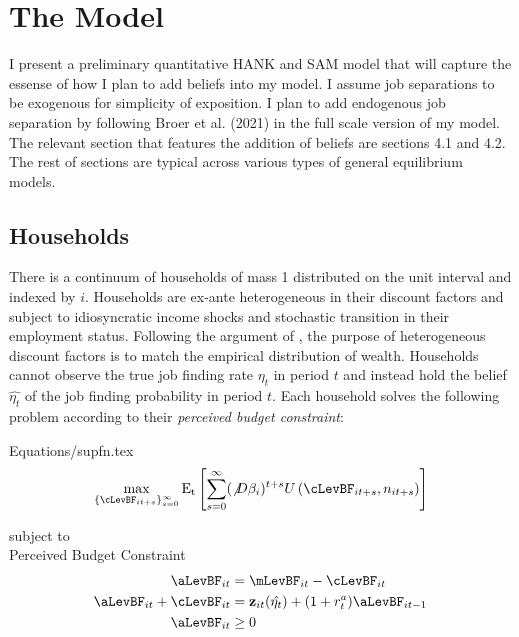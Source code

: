 \documentclass[titlepage]{\econtex}\providecommand{\texname}{Dissertation-Proposal}
\providecommand{\EqDir}{Equations}
\begin{document}
\hypertarget{The-Model}{}
\section{The Model}

I present a preliminary quantitative HANK and SAM model that will capture the essense of how I plan to add beliefs into my model. I assume job separations to be exogenous for simplicity of exposition. I plan to add endogenous job separation by following Broer et al. (2021) in the full scale version of my model. The relevant section that features the addition of beliefs are sections 4.1 and 4.2. The rest of sections are typical across various types of general equilibrium models.

\subsection{Households}
\label{subsec:Households}

There is a continuum of households of mass 1 distributed on the unit
interval and indexed by $i$. Households are ex-ante heterogeneous in their discount factors and subject to idiosyncratic income shocks and stochastic transition in their employment status. Following the argument of \cite{carroll2017distribution}, the purpose of heterogeneous discount factors is to match the empirical distribution of wealth. Households cannot observe the true job finding rate $\eta_{t}$ in period $t$ and instead hold the belief $\hat{\eta_{t}}$ of the job finding probability in period $t$. Each household solves  the following problem according to their \textit{perceived budget constraint}:

\begin{verbatimwrite}{\EqDir/supfn.tex}
\begin{eqnarray}
  \label{eq:supfn}
  \max_{\{\cLevBF_{it+s}\}_{s=0}^{\infty}} \mathrm{E_{t}}\left[\sum_{s=0}^{\infty} (\not D \beta_{i})^{t+s} U\left(  \cLevBF_{i t+s}, n_{i t+s}\right)\right]
\end{eqnarray}
\end{verbatimwrite}
 

subject to \\

Perceived Budget Constraint \\

\begin{align*}
\aLevBF_{it}     &= \mLevBF_{it} - \cLevBF_{it}   \label{eq:DBCparts} \\
\aLevBF_{it} +\cLevBF_{it}    &= \mathbf{z}_{it}(\hat{\eta_{t}}) +   (1 + r^{a}_{t} ) \aLevBF_{it-1} \\ 
\aLevBF_{it}  &\geq 0 \\
\end{align*}
\end{document}
